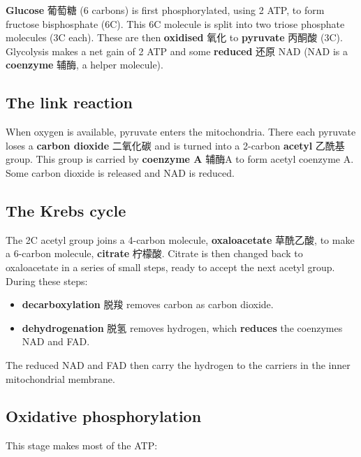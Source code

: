 \documentclass[11pt]{article}
\begin{document}
\textbf{Glucose} 葡萄糖 (6 carbons) is first phosphorylated, using 2 ATP, to form fructose bisphosphate (6C). This 6C molecule is split into two triose phosphate molecules (3C each). These are then \textbf{oxidised} 氧化 to \textbf{pyruvate} 丙酮酸 (3C). Glycolysis makes a net gain of 2 ATP and some \textbf{reduced} 还原 NAD (NAD is a \textbf{coenzyme} 辅酶, a helper molecule).

\subsection*{The link reaction}

When oxygen is available, pyruvate enters the mitochondria. There each pyruvate loses a \textbf{carbon dioxide} 二氧化碳 and is turned into a 2-carbon \textbf{acetyl} 乙酰基 group. This group is carried by \textbf{coenzyme A} 辅酶A to form acetyl coenzyme A. Some carbon dioxide is released and NAD is reduced.

\subsection*{The Krebs cycle}

The 2C acetyl group joins a 4-carbon molecule, \textbf{oxaloacetate} 草酰乙酸, to make a 6-carbon molecule, \textbf{citrate} 柠檬酸. Citrate is then changed back to oxaloacetate in a series of small steps, ready to accept the next acetyl group. During these steps:

\begin{itemize}
\item \textbf{decarboxylation} 脱羧 removes carbon as carbon dioxide.

\item \textbf{dehydrogenation} 脱氢 removes hydrogen, which \textbf{reduces} the coenzymes NAD and FAD.

\end{itemize}

The reduced NAD and FAD then carry the hydrogen to the carriers in the inner mitochondrial membrane.

\subsection*{Oxidative phosphorylation}

This stage makes most of the ATP:
\end{document}
